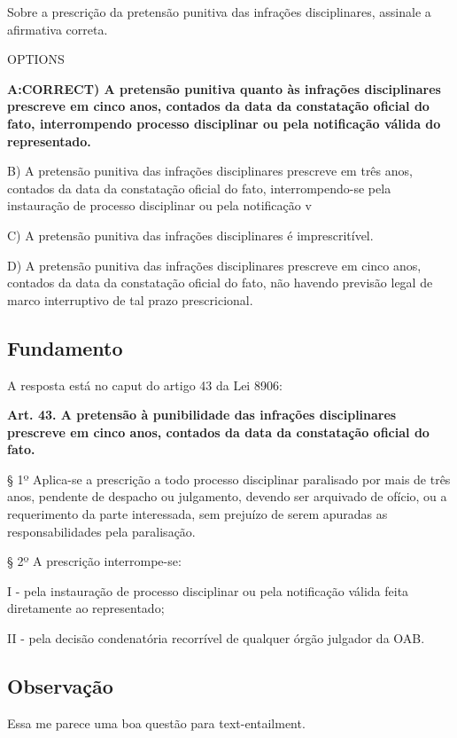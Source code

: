\documentclass[12pt]{article}
\begin{document}
Sobre a prescrição da pretensão punitiva das infrações 
disciplinares, assinale a afirmativa correta.
 
OPTIONS

\textbf{A:CORRECT) A pretensão punitiva quanto às infrações disciplinares
prescreve em cinco anos, contados da data da constatação 
oficial do fato, interrompendo
processo disciplinar ou pela notificação válida do 
representado.} 

B) A pretensão punitiva das infrações disciplinares prescreve 
em três anos, contados da data da constatação oficial do 
fato, interrompendo-se pela instauração de processo 
disciplinar ou pela notificação v

C) A pretensão punitiva das infrações disciplinares é 
imprescritível. 

D) A pretensão punitiva das infrações disciplinares prescreve 
em cinco anos, contados da data da constatação oficial do 
fato, não havendo previsão legal de marco interruptivo de
tal prazo prescricional. 

\subsection{Fundamento}

A resposta está no caput do artigo 43 da Lei 8906:

\textbf{Art. 43. A pretensão à punibilidade das infrações disciplinares prescreve em cinco anos, contados da data da constatação oficial do fato.}

§ 1º Aplica-se a prescrição a todo processo disciplinar paralisado por mais de três anos, pendente de despacho ou julgamento, devendo ser arquivado de ofício, ou a requerimento da parte interessada, sem prejuízo de serem apuradas as responsabilidades pela paralisação.

§ 2º A prescrição interrompe-se:

I - pela instauração de processo disciplinar ou pela notificação válida feita diretamente ao representado;

II - pela decisão condenatória recorrível de qualquer órgão julgador da OAB. 

\subsection{Observação}

Essa me parece uma boa questão para text-entailment.

\noindent\makebox[\linewidth]{\rule{\paperwidth}{0.4pt}}
\end{document}
